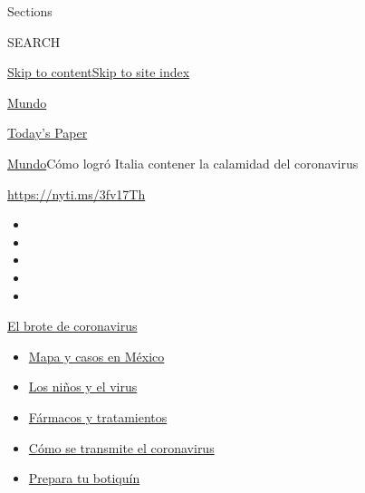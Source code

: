 Sections

SEARCH

\protect\hyperlink{site-content}{Skip to
content}\protect\hyperlink{site-index}{Skip to site index}

\href{https://www.nytimes3xbfgragh.onion/es/section/mundo}{Mundo}

\href{https://myaccount.nytimes3xbfgragh.onion/auth/login?response_type=cookie\&client_id=vi}{}

\href{https://www.nytimes3xbfgragh.onion/section/todayspaper}{Today's
Paper}

\href{/es/section/mundo}{Mundo}\textbar{}Cómo logró Italia contener la
calamidad del coronavirus

\url{https://nyti.ms/3fv17Th}

\begin{itemize}
\item
\item
\item
\item
\item
\end{itemize}

\href{https://www.nytimes3xbfgragh.onion/es/spotlight/coronavirus?action=click\&pgtype=Article\&state=default\&region=TOP_BANNER\&context=storylines_menu}{El
brote de coronavirus}

\begin{itemize}
\tightlist
\item
  \href{https://www.nytimes3xbfgragh.onion/es/interactive/2020/espanol/america-latina/coronavirus-en-mexico.html?action=click\&pgtype=Article\&state=default\&region=TOP_BANNER\&context=storylines_menu}{Mapa
  y casos en México}
\item
  \href{https://www.nytimes3xbfgragh.onion/es/2020/07/31/espanol/ciencia-y-tecnologia/ninos-contagio-coronavirus.html?action=click\&pgtype=Article\&state=default\&region=TOP_BANNER\&context=storylines_menu}{Los
  niños y el virus}
\item
  \href{https://www.nytimes3xbfgragh.onion/es/interactive/2020/science/coronavirus-tratamientos-curas.html?action=click\&pgtype=Article\&state=default\&region=TOP_BANNER\&context=storylines_menu}{Fármacos
  y tratamientos}
\item
  \href{https://www.nytimes3xbfgragh.onion/es/2020/07/06/espanol/ciencia-y-tecnologia/coronavirus-transmision-aire.html?action=click\&pgtype=Article\&state=default\&region=TOP_BANNER\&context=storylines_menu}{Cómo
  se transmite el coronavirus}
\item
  \href{https://www.nytimes3xbfgragh.onion/es/2020/07/14/espanol/estilos-de-vida/botiquin-medicina-coronavirus.html?action=click\&pgtype=Article\&state=default\&region=TOP_BANNER\&context=storylines_menu}{Prepara
  tu botiquín}
\end{itemize}

